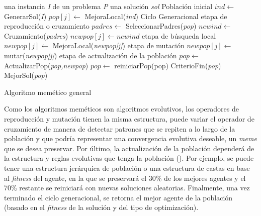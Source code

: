\begin{algorithm}[ht]
	\begin{algorithmic}[1]
		\REQUIRE una instancia \textit{I} de un problema \textit{P}
		\ENSURE una solución \textit{sol}
		\STATE		\COMMENT Población inicial
		\STATE $ind \leftarrow $GenerarSol(\textit{I})
		\STATE $pop[j] \leftarrow$ MejoraLocal(\textit{ind})
		\ENDFOR
		\STATE \COMMENT Ciclo Generacional
		\REPEAT
		\STATE \COMMENT etapa de reproducción o cruzamiento
		\STATE $padres \leftarrow$ SeleccionarPadres(\textit{pop})
		\STATE $newind \leftarrow$ Cruzamiento(\textit{padres})
		\STATE $newpop[j] \leftarrow newind$
		\STATE \COMMENT etapa de búsqueda local
		\STATE $newpop[j] \leftarrow$ MejoraLocal(\textit{newpop[j]})
		\STATE \COMMENT etapa de mutación
		\STATE $newpop[j] \leftarrow$ mutar(\textit{newpop[j]})
		\ENDIF
		\ENDFOR
		\STATE \COMMENT etapa de actualización de la población
		\STATE $pop \leftarrow $ActualizarPop(\textit{pop,newpop})
		\STATE $pop \leftarrow$ reiniciarPop(pop)
		\ENDIF
		\UNTIL CriterioFin(\textit{pop})
		\RETURN MejorSol(\textit{pop})
	\end{algorithmic}
	\caption{Algoritmo memético general}
	\label{alg:memetico-gen}
\end{algorithm}

Como los algoritmos meméticos son algoritmos evolutivos, los operadores de reproducción y mutación tienen la misma estructura, puede variar el operador de cruzamiento de manera de detectar patrones que se repiten a lo largo de la población y que podría representar una convergencia evolutiva deseable, un \textit{meme} que se desea preservar. Por último, la actualización de la población dependerá de la estructura y reglas evolutivas que tenga la población (\citealp{Buriol:2004}). Por ejemplo, se puede tener una estructura jerárquica de población o una estructura de castas en base al \textit{fitness} del agente, en la que se preservará el 30\% de los mejores agentes y el 70\% restante se reiniciará con nuevas soluciones aleatorias. Finalmente, una vez terminado el ciclo generacional, se retorna el mejor agente de la población (basado en el \textit{fitness} de la solución y del tipo de optimización).

\newpage